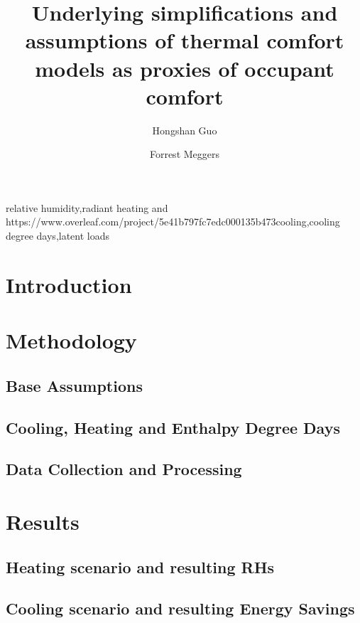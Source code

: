 \documentclass[review]{elsarticle}
\begin{document}
\begin{frontmatter}
\title{Underlying simplifications and assumptions of thermal comfort models as proxies of occupant comfort}
\author[mysecondaryaddress]{Hongshan Guo}
\author[mymainaddress,mysecondaryaddress]{Forrest Meggers}
\address[mymainaddress]{School of Architecture, Princeton University, USA}
\address[mysecondaryaddress]{Andlinger Center for Energy and the Environment, Princeton University, USA.}
\begin{abstract}

\end{abstract}
\begin{keyword}relative humidity\sep radiant heating and https://www.overleaf.com/project/5e41b797fc7edc000135b473cooling\sep cooling degree days\sep latent loads\end{keyword}\end{frontmatter}
\tableofcontents
\section{Introduction}

\section{Methodology}
    \subsection{Base Assumptions}
            
    \subsection{Cooling, Heating and Enthalpy Degree Days}
        
    \subsection{Data Collection and Processing}
        
\section{Results}
    \subsection{Heating scenario and resulting RHs}
    
    \subsection{Cooling scenario and resulting Energy Savings}
    
\end{document}
